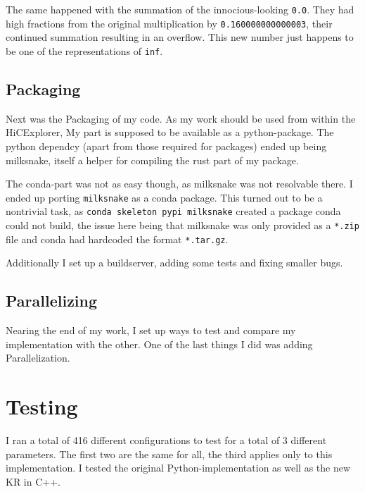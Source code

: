 The same happened with the summation of the innocious-looking \verb|0.0|. They
had high fractions from the original multiplication by
\verb|0.160000000000003|, their continued summation resulting in an overflow.
This new number just happens to be one of the representations of \verb|inf|.


\subsection{Packaging}


Next was the Packaging of my code. As my work should be used from within the
HiCExplorer, My part is supposed to be available as a python-package. The  python dependcy (apart from those required for packages) ended up being
milksnake, itself a helper for compiling the rust part of my package.

The conda-part was not as easy though, as milksnake was not resolvable there. I
ended up porting \verb|milksnake| as a conda package. This turned out to be a
nontrivial task, as \verb|conda skeleton pypi milksnake| created a package
conda could not build, the issue here being that milksnake was only provided as
a \verb|*.zip| file and conda had hardcoded the format \verb|*.tar.gz|.

Additionally I set up a buildserver, adding some tests and fixing smaller bugs.


\subsection{Parallelizing}


Nearing the end of my work, I set up ways to test and compare my implementation
with the other. One of the last things I did was adding Parallelization.



\section{Testing}\label{sec:testing}


I ran a total of 416 different configurations to test for a total of 3
different parameters. The first two are the same for all, the third applies
only to this implementation. I tested the original Python-implementation as
well as the new KR in C++.

